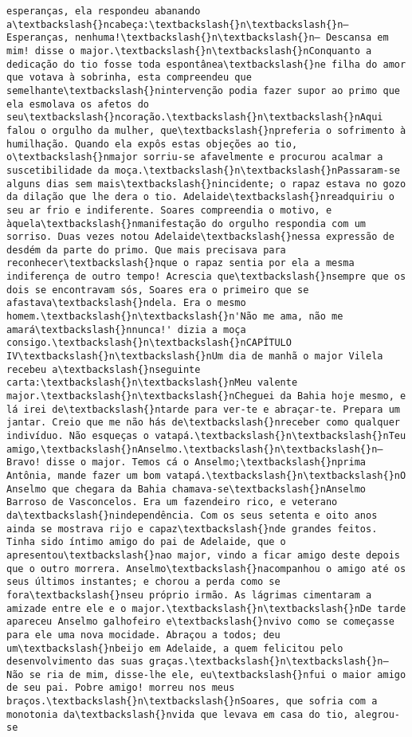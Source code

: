 \documentclass[11pt]{article}
\begin{document}
\begin{Verbatim}[commandchars=\\\{\}]
esperanças, ela respondeu abanando a\textbackslash{}ncabeça:\textbackslash{}n\textbackslash{}n— Esperanças, nenhuma!\textbackslash{}n\textbackslash{}n— Descansa em mim! disse o major.\textbackslash{}n\textbackslash{}nConquanto a dedicação do tio fosse toda espontânea\textbackslash{}ne filha do amor que votava à sobrinha, esta compreendeu que semelhante\textbackslash{}nintervenção podia fazer supor ao primo que ela esmolava os afetos do seu\textbackslash{}ncoração.\textbackslash{}n\textbackslash{}nAqui falou o orgulho da mulher, que\textbackslash{}npreferia o sofrimento à humilhação. Quando ela expôs estas objeções ao tio, o\textbackslash{}nmajor sorriu-se afavelmente e procurou acalmar a suscetibilidade da moça.\textbackslash{}n\textbackslash{}nPassaram-se alguns dias sem mais\textbackslash{}nincidente; o rapaz estava no gozo da dilação que lhe dera o tio. Adelaide\textbackslash{}nreadquiriu o seu ar frio e indiferente. Soares compreendia o motivo, e àquela\textbackslash{}nmanifestação do orgulho respondia com um sorriso. Duas vezes notou Adelaide\textbackslash{}nessa expressão de desdém da parte do primo. Que mais precisava para reconhecer\textbackslash{}nque o rapaz sentia por ela a mesma indiferença de outro tempo! Acrescia que\textbackslash{}nsempre que os dois se encontravam sós, Soares era o primeiro que se afastava\textbackslash{}ndela. Era o mesmo homem.\textbackslash{}n\textbackslash{}n'Não me ama, não me amará\textbackslash{}nnunca!' dizia a moça consigo.\textbackslash{}n\textbackslash{}nCAPÍTULO IV\textbackslash{}n\textbackslash{}nUm dia de manhã o major Vilela recebeu a\textbackslash{}nseguinte carta:\textbackslash{}n\textbackslash{}nMeu valente major.\textbackslash{}n\textbackslash{}nCheguei da Bahia hoje mesmo, e lá irei de\textbackslash{}ntarde para ver-te e abraçar-te. Prepara um jantar. Creio que me não hás de\textbackslash{}nreceber como qualquer indivíduo. Não esqueças o vatapá.\textbackslash{}n\textbackslash{}nTeu amigo,\textbackslash{}nAnselmo.\textbackslash{}n\textbackslash{}n— Bravo! disse o major. Temos cá o Anselmo;\textbackslash{}nprima Antônia, mande fazer um bom vatapá.\textbackslash{}n\textbackslash{}nO Anselmo que chegara da Bahia chamava-se\textbackslash{}nAnselmo Barroso de Vasconcelos. Era um fazendeiro rico, e veterano da\textbackslash{}nindependência. Com os seus setenta e oito anos ainda se mostrava rijo e capaz\textbackslash{}nde grandes feitos. Tinha sido íntimo amigo do pai de Adelaide, que o apresentou\textbackslash{}nao major, vindo a ficar amigo deste depois que o outro morrera. Anselmo\textbackslash{}nacompanhou o amigo até os seus últimos instantes; e chorou a perda como se fora\textbackslash{}nseu próprio irmão. As lágrimas cimentaram a amizade entre ele e o major.\textbackslash{}n\textbackslash{}nDe tarde apareceu Anselmo galhofeiro e\textbackslash{}nvivo como se começasse para ele uma nova mocidade. Abraçou a todos; deu um\textbackslash{}nbeijo em Adelaide, a quem felicitou pelo desenvolvimento das suas graças.\textbackslash{}n\textbackslash{}n— Não se ria de mim, disse-lhe ele, eu\textbackslash{}nfui o maior amigo de seu pai. Pobre amigo! morreu nos meus braços.\textbackslash{}n\textbackslash{}nSoares, que sofria com a monotonia da\textbackslash{}nvida que levava em casa do tio, alegrou-se 
\end{Verbatim}
\end{document}
